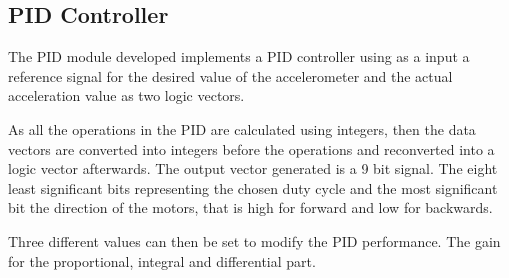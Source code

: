 \subsection{PID Controller}

The PID module developed implements a PID controller using as a input a reference signal for the desired value of the accelerometer and the actual acceleration value as two logic vectors.

As all the operations in the PID are calculated using integers, then the data vectors are converted into integers before the operations and reconverted into a logic vector afterwards.
The output vector generated is a 9 bit signal.
The eight least significant bits representing the chosen duty cycle and the most significant bit the direction of the motors, that is high for forward and low for backwards.

Three different values can then be set to modify the PID performance.
The gain for the proportional, integral and differential part.
